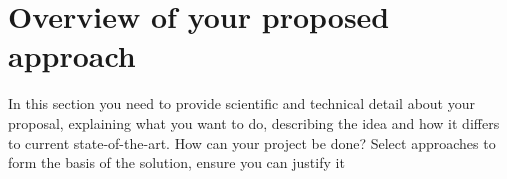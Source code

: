 \section{Overview of your proposed approach}\label{sec:our_approach}

In this section you need to provide scientific and technical detail about your proposal, explaining what you want to do, describing the idea and how it differs to current state-of-the-art. How can your project be done?
Select approaches to form the basis of the solution, ensure you can justify it